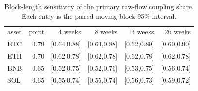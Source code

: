\begin{table}[!htbp]
\caption{Block-length sensitivity of the primary raw-flow coupling share. Each entry is the paired moving-block 95\% interval.}
\label{tab:block-sensitivity}
\begin{ruledtabular}
\begin{tabular}{lrrrrr}
asset & point & 4 weeks & 8 weeks & 13 weeks & 26 weeks \\
\colrule
BTC & 0.79 & [0.64,0.88] & [0.63,0.88] & [0.62,0.89] & [0.60,0.90] \\
ETH & 0.70 & [0.62,0.78] & [0.62,0.78] & [0.62,0.78] & [0.62,0.78] \\
BNB & 0.65 & [0.52,0.75] & [0.52,0.76] & [0.53,0.75] & [0.56,0.74] \\
SOL & 0.65 & [0.55,0.74] & [0.55,0.74] & [0.56,0.73] & [0.59,0.72] \\
\end{tabular}
\end{ruledtabular}
\end{table}

